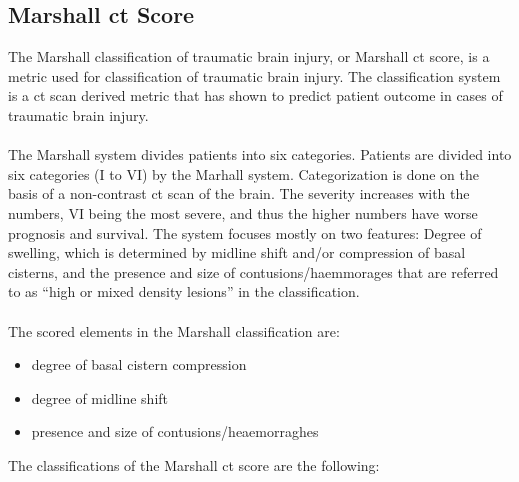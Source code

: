 \documentclass[11pt]{article}
\begin{document}
\subsection{Marshall \gls{ct} Score}
The Marshall classification of traumatic brain injury, or Marshall \gls{ct} score, is a metric used for classification of traumatic brain injury. The classification system is a \gls{ct} scan derived metric that has shown to predict patient outcome in cases of traumatic brain injury.\cite{gaillardMarshallClassificationTraumatic}\\
\\
The Marshall system divides patients into six categories.
Patients are divided into six categories (I to VI) by the Marhall system. Categorization is done on the basis of a non-contrast \gls{ct} scan of the brain. The severity increases with the numbers, VI being the most severe, and thus the higher numbers have worse prognosis and survival. The system focuses mostly on two features: Degree of swelling, which is determined by midline shift and/or compression of basal cisterns, and the presence and size of contusions/haemmorages that are referred to as ``high or mixed density lesions'' in the classification.\cite{gaillardMarshallClassificationTraumatic}\\
\\
The scored elements in the Marshall classification are:

\begin{itemize}
\item{degree of basal cistern compression}
\item{degree of midline shift}
\item{presence and size of contusions/heaemorraghes}
\end{itemize}

The classifications of the Marshall \gls{ct} score are the following:
\end{document}
